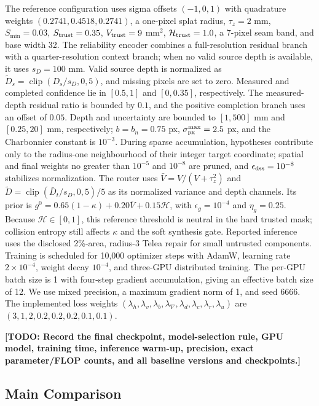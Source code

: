 \documentclass[letterpaper,10pt,conference]{ieeeconf}
\newcommand{\todo}[1]{\textcolor{todoRed}{\textbf{[TODO: #1]}}}
\begin{document}
The reference configuration uses sigma offsets $(-1,0,1)$ with quadrature
weights $(0.2741,0.4518,0.2741)$, a one-pixel splat radius,
$\tau_z=2$ mm, $S_{\min}=0.03$, $S_{\rm trust}=0.35$,
$V_{\rm trust}=9$ mm$^2$, $\mathcal H_{\rm trust}=1.0$, a 7-pixel seam band,
and base width 32. The reliability encoder combines a full-resolution residual
branch with a quarter-resolution context branch; when no valid source depth is
available, it uses $s_D=100$ mm. Valid source depth is normalized as
$\widetilde D_s=\operatorname{clip}(D_s/s_D,0,5)$, and missing pixels are set
to zero. Measured and completed confidence lie in $[0.5,1]$ and $[0,0.35]$,
respectively. The measured-depth residual ratio is bounded by $0.1$, and the
positive completion branch uses an offset of $0.05$. Depth and uncertainty are
bounded to $[1,500]$ mm and $[0.25,20]$ mm, respectively; $b=b_n=0.75$ px,
$\sigma_{\rm px}^{\max}=2.5$ px, and the Charbonnier constant is $10^{-3}$.
During sparse accumulation, hypotheses contribute only to the radius-one
neighbourhood of their integer target coordinate; spatial and final weights no
greater than $10^{-5}$ and $10^{-8}$ are pruned, and
$\epsilon_{\rm dss}=10^{-8}$ stabilizes normalization.
The router uses $\bar V=V/(V+\tau_z^2)$ and
$\widetilde D=\operatorname{clip}(\bar D_t/s_D,0,5)/5$ as its normalized
variance and depth channels. Its prior is
$g^0=0.65(1-\kappa)+0.20\bar V+0.15\mathcal H$, with
$\epsilon_g=10^{-4}$ and $\eta_g=0.25$.
Because $\mathcal H\in[0,1]$, this reference threshold is
neutral in the hard trusted mask; collision entropy still affects
$\kappa$ and the soft synthesis gate. Reported inference uses the disclosed
2\%-area, radius-3 Telea repair for small untrusted components. Training is
scheduled for 10,000 optimizer steps with AdamW, learning rate $2\times10^{-4}$,
weight decay $10^{-4}$, and three-GPU distributed training. The per-GPU batch
size is 1 with four-step gradient accumulation, giving an effective batch size
of 12. We use mixed precision, a maximum gradient norm of 1, and seed 6666. The
implemented loss weights
$(\lambda_h,\lambda_v,\lambda_b,\lambda_\nabla,\lambda_d,\lambda_c,
\lambda_r,\lambda_u)$ are $(3,1,2,0.2,0.2,0.2,0.1,0.1)$.

\todo{Record the final checkpoint, model-selection rule, GPU model, training
time, inference warm-up, precision, exact parameter/FLOP counts, and all
baseline versions and checkpoints.}

\subsection{Main Comparison}
\end{document}
